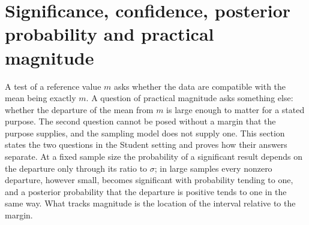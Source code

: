 \section{Significance, confidence, posterior probability and practical magnitude}
\label{sec:p15-w02b-p15-059-magnitude}

A test of a reference value \(m\) asks whether the data are compatible with
the mean being exactly \(m\). A question of practical magnitude asks
something else: whether the departure of the mean from \(m\) is large
enough to matter for a stated purpose. The second question cannot be
posed without a margin that the purpose supplies, and the sampling model
does not supply one. This section states the two questions in the Student
setting and proves how their answers separate. At a fixed sample size the
probability of a significant result depends on the departure only through
its ratio to \(\sigma\); in large samples every nonzero departure, however
small, becomes significant with probability tending to one, and a posterior
probability that the departure is positive tends to one in the same way.
What tracks magnitude is the location of the interval relative to the
margin.

